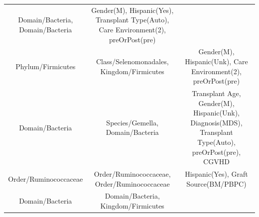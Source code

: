 \documentclass[12pt,twoside]{dukestatscithesis}
\begin{document}
\begin{longtable}[]{@{}ccc@{}}
\begin{minipage}[t]{0.46\columnwidth}
Domain/Bacteria, Domain/Bacteria\strut
\end{minipage} & \begin{minipage}[t]{0.22\columnwidth}\centering\strut
Gender(M), Hispanic(Yes), Transplant Type(Auto), Care Environment(2),
preOrPost(pre)\strut
\end{minipage}\tabularnewline
\begin{minipage}[t]{0.23\columnwidth}\centering\strut
Phylum/Firmicutes\strut
\end{minipage} & \begin{minipage}[t]{0.46\columnwidth}\centering\strut
Class/Selenomonadales, Kingdom/Firmicutes\strut
\end{minipage} & \begin{minipage}[t]{0.22\columnwidth}\centering\strut
Gender(M), Hispanic(Unk), Care Environment(2), preOrPost(pre)\strut
\end{minipage}\tabularnewline
\begin{minipage}[t]{0.23\columnwidth}\centering\strut
Domain/Bacteria\strut
\end{minipage} & \begin{minipage}[t]{0.46\columnwidth}\centering\strut
Species/Gemella, Domain/Bacteria\strut
\end{minipage} & \begin{minipage}[t]{0.22\columnwidth}\centering\strut
Transplant Age, Gender(M), Hispanic(Unk), Diagnosis(MDS), Transplant
Type(Auto), preOrPost(pre), CGVHD\strut
\end{minipage}\tabularnewline
\begin{minipage}[t]{0.23\columnwidth}\centering\strut
Order/Ruminococcaceae\strut
\end{minipage} & \begin{minipage}[t]{0.46\columnwidth}\centering\strut
Order/Ruminococcaceae, Order/Ruminococcaceae\strut
\end{minipage} & \begin{minipage}[t]{0.22\columnwidth}\centering\strut
Hispanic(Yes), Graft Source(BM/PBPC)\strut
\end{minipage}\tabularnewline
\begin{minipage}[t]{0.23\columnwidth}\centering\strut
Domain/Bacteria\strut
\end{minipage} & \begin{minipage}[t]{0.46\columnwidth}\centering\strut
Domain/Bacteria, Kingdom/Firmicutes\strut
\end{minipage} & \begin{minipage}[t]{0.22\columnwidth}\centering\strut

\end{minipage}
\end{longtable}
\end{document}
